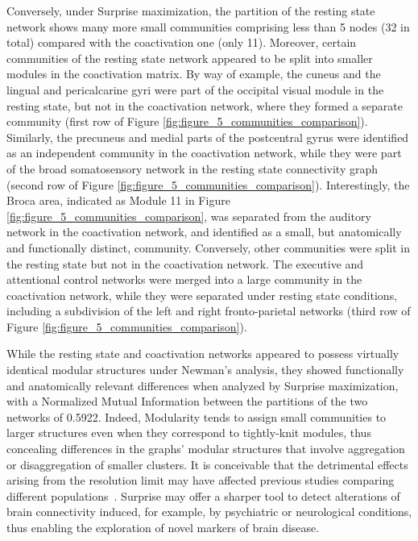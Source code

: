 Conversely, under Surprise maximization, the partition of the resting state network shows many more small communities comprising less than 5 nodes (32 in total) compared with the coactivation one (only 11). Moreover, certain communities of the resting state network appeared to be split into smaller modules in the coactivation matrix. 
By way of example, the cuneus and the lingual and pericalcarine gyri were part of the occipital visual module in the resting state, but not in the coactivation network, where they formed a separate community (first row of Figure \ref{fig:figure_5_communities_comparison}).
Similarly, the precuneus and medial parts of the postcentral gyrus were identified as an independent community in the coactivation network, while they were part of the broad somatosensory network in the resting state connectivity graph~\cite{rubinov2011} (second row of Figure \ref{fig:figure_5_communities_comparison}).
Interestingly, the Broca area, indicated as Module 11 in Figure \ref{fig:figure_5_communities_comparison}, was separated from the auditory network in the coactivation network, and identified as a small, but anatomically and functionally distinct, community.
Conversely, other communities were split in the resting state but not in the coactivation network. The executive and attentional control networks were merged into a large community in the coactivation network, while they were separated under resting state conditions, including a subdivision of the left and right fronto-parietal networks (third row of Figure \ref{fig:figure_5_communities_comparison}).

While the resting state and coactivation networks appeared to possess virtually identical modular structures under Newman's analysis, they showed functionally and anatomically relevant differences when analyzed by Surprise maximization, with a Normalized Mutual Information between the partitions of the two networks of 0.5922. Indeed, Modularity tends to assign small communities to larger structures even when they correspond to tightly-knit modules, thus concealing differences in the graphs' modular structures that involve aggregation or disaggregation of smaller clusters. It is conceivable that the detrimental effects arising from the resolution limit may have affected previous studies comparing different populations~\cite{meunier2010}.
Surprise may offer a sharper tool to detect alterations of brain connectivity induced, for example, by psychiatric or neurological conditions, thus enabling the exploration of novel markers of brain disease.

